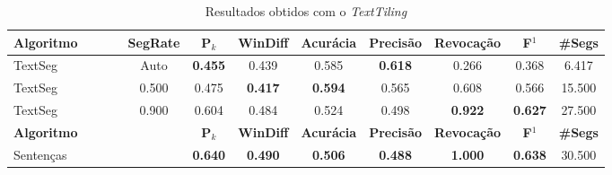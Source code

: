 \documentclass{article}
\begin{document}
\begin{table}[!h]
\begin{tabular}{|l||c|c|c|c|c|c|c|c|c|c|c|}
\hline
		\textbf{Algoritmo} &&&&
		\textbf{SegRate} & 
		\textbf{P$_k$} & 
		\textbf{WinDiff} & 
		\textbf{Acurácia} & 
		\textbf{Precisão} & 
		\textbf{Revocação} &
		\textbf{F$^1$} &
		\textbf{\#Segs} \\	\hline




TextSeg &&&& Auto & \cellcolor{gray!20} \textbf{0.455} & 0.439 & 0.585 & \cellcolor{gray!20} \textbf{0.618} & 0.266 & 0.368 & 6.417  \\ \hline 

 TextSeg &&&& 0.500 & 0.475 & \cellcolor{gray!20} \textbf{0.417} & \cellcolor{gray!20} \textbf{0.594} & 0.565 & 0.608 & 0.566 & 15.500  \\ \hline 

 TextSeg &&&& 0.900 & 0.604 & 0.484 & 0.524 & 0.498 & \cellcolor{gray!20} \textbf{0.922} & \cellcolor{gray!20} \textbf{0.627} & 27.500  \\ \hline 

\hline
		\textbf{Algoritmo} &&&&& 
		\textbf{P$_k$} & 
		\textbf{WinDiff} & 
		\textbf{Acurácia} & 
		\textbf{Precisão} & 
		\textbf{Revocação} &
		\textbf{F$^1$} &
		\textbf{\#Segs} \\	\hline


Sentenças &&&&& \cellcolor{gray!20} \textbf{0.640} & \cellcolor{gray!20} \textbf{0.490} & \cellcolor{gray!20} \textbf{0.506} & \cellcolor{gray!20} \textbf{0.488} & \cellcolor{gray!20} \textbf{1.000} & \cellcolor{gray!20} \textbf{0.638} & 30.500  \\ \hline 



	\end{tabular}
	\caption{Resultados obtidos com o \textit{TextTiling}}
	\label{tab:resultadosTT}
\end{table}
\end{document}
